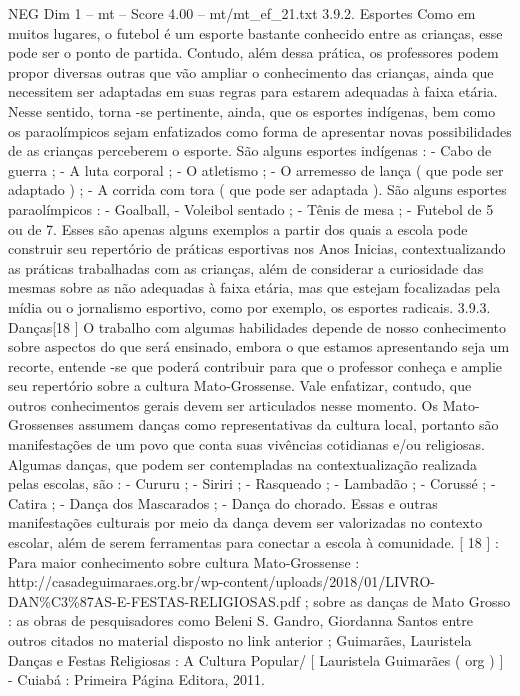 \begin{textsample}{NEG Dim 1 – mt – Score 4.00 – mt/mt\_ef\_21.txt}  \label{ex:f1_neg_220}
3.9.2.
Esportes Como em muitos lugares, o futebol é um esporte bastante conhecido entre as crianças, esse pode ser o ponto de partida.
Contudo, além dessa prática, os professores podem propor diversas outras que vão ampliar o conhecimento das crianças, ainda que necessitem ser adaptadas em suas regras para estarem adequadas à faixa etária.
Nesse sentido, torna -se pertinente, ainda, que os esportes indígenas, bem como os paraolímpicos sejam enfatizados como forma de apresentar novas possibilidades de as crianças perceberem o esporte.
São alguns esportes indígenas : - Cabo de guerra ; - A luta corporal ; - O atletismo ; - O arremesso de lança ( que pode ser adaptado ) ; - A corrida com tora ( que pode ser adaptada ).
São alguns esportes paraolímpicos : - Goalball, - Voleibol sentado ; - Tênis de mesa ; - Futebol de 5 ou de 7.
Esses são apenas alguns exemplos a partir dos quais a escola pode construir seu repertório de práticas esportivas nos Anos Inicias, contextualizando as práticas trabalhadas com as crianças, além de considerar a curiosidade das mesmas sobre as não adequadas à faixa etária, mas que estejam focalizadas pela mídia ou o jornalismo esportivo, como por exemplo, os esportes radicais. 3.9.3.
Danças[18 ] O trabalho com algumas habilidades depende de nosso conhecimento sobre aspectos do que será ensinado, embora o que estamos apresentando seja um recorte, entende -se que poderá contribuir para que o professor conheça e amplie seu repertório sobre a cultura Mato-Grossense.
Vale enfatizar, contudo, que outros conhecimentos gerais devem ser articulados nesse momento.
Os Mato-Grossenses assumem danças como representativas da cultura local, portanto são manifestações de um povo que conta suas vivências cotidianas e/ou religiosas.
Algumas danças, que podem ser contempladas na contextualização realizada pelas escolas, são : - Cururu ; - Siriri ; - Rasqueado ; - Lambadão ; - Corussé ; - Catira ; - Dança dos Mascarados ; - Dança do chorado.
Essas e outras manifestações culturais por meio da dança devem ser valorizadas no contexto escolar, além de serem ferramentas para conectar a escola à comunidade. [ 18 ] : Para maior conhecimento sobre cultura Mato-Grossense : http://casadeguimaraes.org.br/wp-content/uploads/2018/01/LIVRO-DAN\%C3\%87AS-E-FESTAS-RELIGIOSAS.pdf ; sobre as danças de Mato Grosso : as obras de pesquisadores como Beleni S.
Gandro, Giordanna Santos entre outros citados no material disposto no link anterior ; Guimarães, Lauristela Danças e Festas Religiosas : A Cultura Popular/ [ Lauristela Guimarães ( org ) ] - Cuiabá : Primeira Página Editora, 2011.

\end{textsample}
